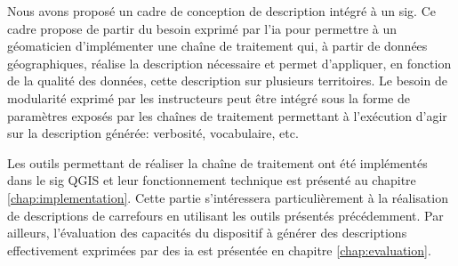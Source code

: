 \newpar{}

Nous avons proposé un cadre de conception de description intégré à un \gls{sig}. Ce cadre propose de partir du besoin exprimé par l'\gls{ia} pour permettre à un géomaticien d'implémenter une chaîne de traitement qui, à partir de données géographiques, réalise la description nécessaire et permet d'appliquer, en fonction de la qualité des données, cette description sur plusieurs territoires. Le besoin de modularité exprimé par les instructeurs peut être intégré sous la forme de paramètres exposés par les chaînes de traitement permettant à l'exécution d'agir sur la description générée: verbosité, vocabulaire, etc. 

\newpar{}

Les outils permettant de réaliser la chaîne de traitement ont été implémentés dans le \gls{sig} QGIS et leur fonctionnement technique est présenté au chapitre \ref{chap:implementation}. Cette partie s'intéressera particulièrement à la réalisation de descriptions de carrefours en utilisant les outils présentés précédemment. Par ailleurs, l'évaluation des capacités du dispositif à générer des descriptions effectivement exprimées par des \gls{ia} est présentée en chapitre \ref{chap:evaluation}.